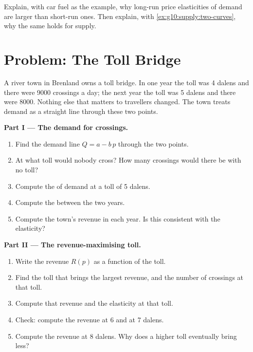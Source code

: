 \begin{exercise}[$\star\star\star$]\label{exo:g10:elasticities:15}
Explain, with car fuel as the example, why long-run price elasticities of demand are larger than short-run ones. Then explain, with
\cref{ex:g10:supply:two-curves}, why the same holds for supply.
\end{exercise}

\section{Problem: The Toll Bridge}

\begin{problem}
\label{pb:g10:elasticities:1}
A river town in Brenland owns a toll bridge. In one year the toll was 4 dalens and there were \num{9000} crossings a day; the next year the toll was 5
dalens and there were \num{8000}. Nothing else that matters to travellers changed. The town treats demand as a straight line through these two points.

\medskip
\noindent\textbf{Part I --- The demand for crossings.}
\begin{enumerate}
\item Find the demand line $Q = a - b\,p$ through the two points.
\item At what toll would nobody cross? How many crossings would there be with no toll?
\item Compute the  of demand at a toll of 5 dalens.
\item Compute the  between the two years.
\item Compute the town's revenue in each year. Is this consistent with the elasticity?
\end{enumerate}

\medskip
\noindent\textbf{Part II --- The revenue-maximising toll.}
\begin{enumerate}[resume]
\item Write the revenue $R(p)$ as a function of the toll.
\item Find the toll that brings the largest revenue, and the number of crossings at that toll.
\item Compute that revenue and the elasticity at that toll.
\item Check: compute the revenue at 6 and at 7 dalens.
\item Compute the revenue at 8 dalens. Why does a higher toll eventually bring less?
\end{enumerate}


\end{problem}
